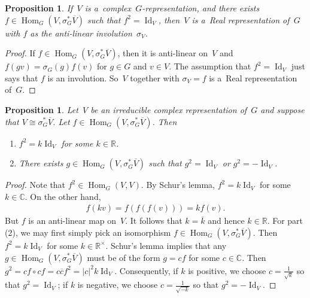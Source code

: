 \documentclass[pdftex]{sigma}
\numberwithin{equation}{section}
\newtheorem{Proposition}[Theorem]{Proposition}
{\theoremstyle{definition}
\newtheorem{Definition}[Theorem]{Definition}
\newtheorem{Example}[Theorem]{Example}
\newtheorem{Remark}[Theorem]{Remark}
}
\DeclareMathOperator{\Hom}{Hom}
\DeclareMathOperator{\Id}{Id}
\begin{document}
\begin{Proposition}
If~$V$ is a~complex~$G$-representation, and there exists $f\in\Hom_G(V,\sigma_G^*\overline{V})$
such that $f^2=\Id_V$, then~$V$ is a~Real representation of~$G$ with $f$ as the anti-linear involution~$\sigma_V$.
\end{Proposition}
\begin{proof}
If $f\in\Hom_G(V,
\sigma_G^*\overline{V})$, then it is anti-linear on~$V$ and $f(gv)=
\sigma_G(g)f(v)$ for $g\in G$ and $v\in V$.
The assumption that $f^2=\Id
_V$ just says that $f$ is an involution.
So~$V$ together with $\sigma_V=f$ is a~Real representation of~$G$.
\end{proof}
\begin{Proposition}
Let~$V$ be an irreducible complex representation of~$G$ and suppose that $V\cong
\sigma_G^*\overline{V}$.
Let $f\in\Hom_G(V,
\sigma_G^*\overline{V})$.
Then
\begin{enumerate}\itemsep=0pt
\item[$1.$]
$f^2=k\Id_V$ for some $k\in\mathbb{R}$.
\item[$2.$]
There exists $g\in\Hom_G(V,
\sigma_G^*\overline{V})$ such that $g^2=\Id_V$ or $g^2=-\Id_V$.
\end{enumerate}
\end{Proposition}
\begin{proof}
Note that $f^2\in\Hom_G(V, V)$.
By Schur's lemma, $f^2=k\Id_V$ for some $k\in\mathbb{C}$.
On the other hand,
\begin{gather*}
f(kv)=f(f(f(v)))=kf(v).
\end{gather*}
But $f$ is an anti-linear map on~$V$.
It follows that $k=\overline{k}$ and hence $k\in\mathbb{R}$.
For part (2), we may f\/irst simply pick an isomorphism $f\in\Hom_G(V,
\sigma_G^*\overline{V})$.
Then $f^2=k\Id_V$ for some $k\in\mathbb{R}^\times$.
Schur's lemma implies that any $g\in\Hom_G(V,
\sigma_G^*\overline{V})$ must be of the form $g=cf$ for some $c\in\mathbb{C}$.
Then $g^2=cf\circ cf=c\overline{c}f^2=|c|^2k\Id_V$.
Consequently, if $k$ is positive, we choose $c=\frac{1}{\sqrt{k}}$ so that $g^2=\Id_V$; if $k$ is negative, we choose $c=\frac{1}{\sqrt{-k}}$ so that $g^2=-\Id_V$.
\end{proof}
\end{document}
